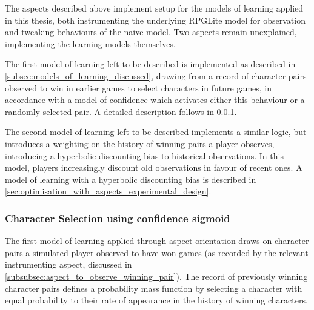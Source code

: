 The aspects described above implement setup for the models of learning applied in this thesis,
both instrumenting the underlying RPGLite model for observation and tweaking behaviours of the naive model.
Two aspects remain unexplained, implementing the learning models themselves.

The first model of learning left to be described is implemented as described in
\cref{subsec:models_of_learning_discussed}, drawing from a record of character pairs observed to win
in earlier games to select characters in future games, in accordance with a model of confidence which activates
either this behaviour or a randomly selected pair. A detailed description follows in
\cref{subsubsec:learning_by_picking_from_distribution_of_wins_with_confidence}.

The second model of learning left to be described
implements a similar logic, but introduces a weighting on the history of winning pairs a player
observes, introducing a hyperbolic discounting bias to historical observations. 
In this model, players increasingly discount old observations in favour of recent ones. A model of learning with
a hyperbolic discounting bias is described in
\cref{sec:optimisation_with_aspects_experimental_design}.



\subsubsection{Character Selection using confidence sigmoid}\label{subsubsec:learning_by_picking_from_distribution_of_wins_with_confidence}

The first model of learning applied through aspect orientation draws on character pairs a 
simulated player observed to have won games (as recorded by the relevant instrumenting aspect,
discussed in \cref{subsubsec:aspect_to_observe_winning_pair}). The record of previously winning character
pairs defines a probability mass function by selecting a character with equal probability to
their rate of appearance in the history of winning characters.

